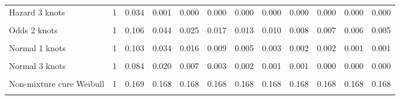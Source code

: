 \documentclass[
]{article}
\begin{document}
\begin{table}[H]
{\begin{tabular}[t]{lrrrrrrrrrrr}
Hazard 3 knots & 1 & 0.034 & 0.001 & 0.000 & 0.000 & 0.000 & 0.000 & 0.000 & 0.000 & 0.000 & 0.000\\
\cellcolor{gray!10}{Odds 1 knots} & \cellcolor{gray!10}{1} & \cellcolor{gray!10}{0.115} & \cellcolor{gray!10}{0.052} & \cellcolor{gray!10}{0.032} & \cellcolor{gray!10}{0.023} & \cellcolor{gray!10}{0.017} & \cellcolor{gray!10}{0.014} & \cellcolor{gray!10}{0.012} & \cellcolor{gray!10}{0.010} & \cellcolor{gray!10}{0.009} & \cellcolor{gray!10}{0.008}\\
Odds 2 knots & 1 & 0.106 & 0.044 & 0.025 & 0.017 & 0.013 & 0.010 & 0.008 & 0.007 & 0.006 & 0.005\\
\cellcolor{gray!10}{Odds 3 knots} & \cellcolor{gray!10}{1} & \cellcolor{gray!10}{0.094} & \cellcolor{gray!10}{0.033} & \cellcolor{gray!10}{0.018} & \cellcolor{gray!10}{0.011} & \cellcolor{gray!10}{0.008} & \cellcolor{gray!10}{0.006} & \cellcolor{gray!10}{0.005} & \cellcolor{gray!10}{0.004} & \cellcolor{gray!10}{0.003} & \cellcolor{gray!10}{0.003}\\
Normal 1 knots & 1 & 0.103 & 0.034 & 0.016 & 0.009 & 0.005 & 0.003 & 0.002 & 0.002 & 0.001 & 0.001\\
\cellcolor{gray!10}{Normal 2 knots} & \cellcolor{gray!10}{1} & \cellcolor{gray!10}{0.101} & \cellcolor{gray!10}{0.033} & \cellcolor{gray!10}{0.015} & \cellcolor{gray!10}{0.008} & \cellcolor{gray!10}{0.005} & \cellcolor{gray!10}{0.003} & \cellcolor{gray!10}{0.002} & \cellcolor{gray!10}{0.001} & \cellcolor{gray!10}{0.001} & \cellcolor{gray!10}{0.001}\\
Normal 3 knots & 1 & 0.084 & 0.020 & 0.007 & 0.003 & 0.002 & 0.001 & 0.001 & 0.000 & 0.000 & 0.000\\
\cellcolor{gray!10}{Mixture cure Weibull} & \cellcolor{gray!10}{1} & \cellcolor{gray!10}{0.179} & \cellcolor{gray!10}{0.179} & \cellcolor{gray!10}{0.179} & \cellcolor{gray!10}{0.179} & \cellcolor{gray!10}{0.179} & \cellcolor{gray!10}{0.179} & \cellcolor{gray!10}{0.179} & \cellcolor{gray!10}{0.179} & \cellcolor{gray!10}{0.179} & \cellcolor{gray!10}{0.179}\\
Non-mixture cure Weibull & 1 & 0.169 & 0.168 & 0.168 & 0.168 & 0.168 & 0.168 & 0.168 & 0.168 & 0.168 & 0.168\\
\cellcolor{gray!10}{Mixture cure Log-normal} & \cellcolor{gray!10}{1} & \cellcolor{gray!10}{0.134} & \cellcolor{gray!10}{0.111} & \cellcolor{gray!10}{0.108} & \cellcolor{gray!10}{0.108} & \cellcolor{gray!10}{0.108} & \cellcolor{gray!10}{0.107} & \cellcolor{gray!10}{0.107} & \cellcolor{gray!10}{0.107} & \cellcolor{gray!10}{0.107} & \cellcolor{gray!10}{0.107}\\

\end{tabular}}
\end{table}
\end{document}
